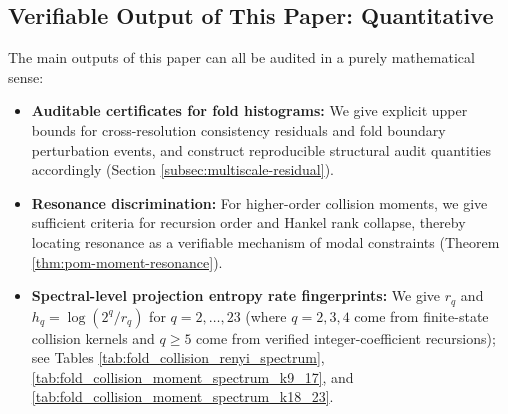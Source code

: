 \subsection{Verifiable Output of This Paper: Quantitative}
The main outputs of this paper can all be audited in a purely mathematical sense:
\begin{itemize}
  \item \textbf{Auditable certificates for fold histograms:} We give explicit upper bounds for cross-resolution consistency residuals and fold boundary perturbation events, and construct reproducible structural audit quantities accordingly (Section \ref{subsec:multiscale-residual}).
  \item \textbf{Resonance discrimination:} For higher-order collision moments, we give sufficient criteria for recursion order and Hankel rank collapse, thereby locating resonance as a verifiable mechanism of modal constraints (Theorem \ref{thm:pom-moment-resonance}).
  \item \textbf{Spectral-level projection entropy rate fingerprints:} We give \(r_q\) and \(h_q=\log(2^q/r_q)\) for \(q=2,\dots,23\) (where \(q=2,3,4\) come from finite-state collision kernels and \(q\ge 5\) come from verified integer-coefficient recursions); see Tables \ref{tab:fold_collision_renyi_spectrum}, \ref{tab:fold_collision_moment_spectrum_k9_17}, and \ref{tab:fold_collision_moment_spectrum_k18_23}.
\end{itemize}

